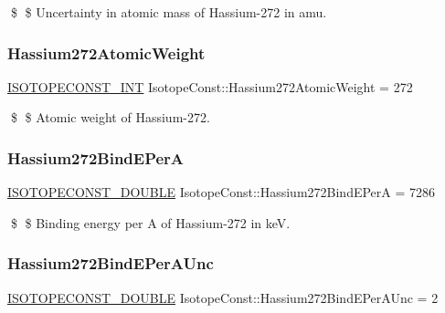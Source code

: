 \$ \$ Uncertainty in atomic mass of Hassium-\/272 in amu. \mbox{\label{group___isotope_const-_hassium-_hs272_gacc94fc42ba014c5e7e7860793e7df3db}} 
\subsubsection{\texorpdfstring{Hassium272\+Atomic\+Weight}{Hassium272AtomicWeight}}
{\footnotesize\ttfamily \mbox{\hyperlink{group___isotope_const-_macros_ga5f18360b3e99483a35c32d789e62621c}{I\+S\+O\+T\+O\+P\+E\+C\+O\+N\+S\+T\+\_\+\+I\+NT}} Isotope\+Const\+::\+Hassium272\+Atomic\+Weight = 272}

\$ \$ Atomic weight of Hassium-\/272. \mbox{\label{group___isotope_const-_hassium-_hs272_ga3a416e13c9cb748e0f4304dad2545750}} 
\subsubsection{\texorpdfstring{Hassium272\+Bind\+E\+PerA}{Hassium272BindEPerA}}
{\footnotesize\ttfamily \mbox{\hyperlink{group___isotope_const-_macros_ga8f45a7272ce02c0b4c65c44636ed719a}{I\+S\+O\+T\+O\+P\+E\+C\+O\+N\+S\+T\+\_\+\+D\+O\+U\+B\+LE}} Isotope\+Const\+::\+Hassium272\+Bind\+E\+PerA = 7286}

\$ \$ Binding energy per A of Hassium-\/272 in keV. \mbox{\label{group___isotope_const-_hassium-_hs272_ga2e917fe20381e6c1e3119a6d50675326}} 
\subsubsection{\texorpdfstring{Hassium272\+Bind\+E\+Per\+A\+Unc}{Hassium272BindEPerAUnc}}
{\footnotesize\ttfamily \mbox{\hyperlink{group___isotope_const-_macros_ga8f45a7272ce02c0b4c65c44636ed719a}{I\+S\+O\+T\+O\+P\+E\+C\+O\+N\+S\+T\+\_\+\+D\+O\+U\+B\+LE}} Isotope\+Const\+::\+Hassium272\+Bind\+E\+Per\+A\+Unc = 2}

